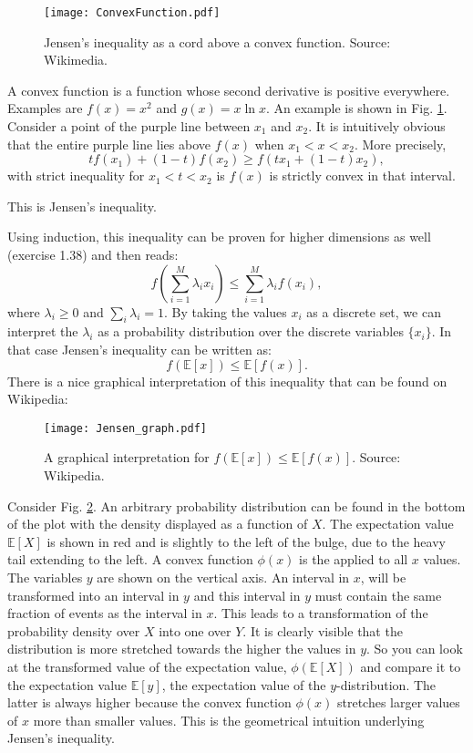 \begin{figure}[!ht]
\begin{center}
\texttt{[image: ConvexFunction.pdf]}
\end{center}
\caption{Jensen's inequality as a cord above a convex function. Source: Wikimedia.}
\label{fig-convex}
\end{figure}

A convex function is a function whose second derivative is positive everywhere. Examples are $f(x) = x^2$ and $g(x) = x \ln x$. An example is shown in Fig. \ref{fig-convex}.
Consider a point of the purple line between $x_1$ and $x_2$. It is intuitively obvious that the entire purple line lies above $f(x)$ when $x_1 < x < x_2$. More precisely,
$$
tf(x_1) + (1-t)f(x_2) \ge f(t x_1 + (1 - t) x_2),
$$
with strict inequality for $x_1 < t < x_2$ is $f(x)$ is strictly convex in that interval.

This is Jensen's inequality.

Using induction, this inequality can be proven for higher dimensions as well \cite{bishop2006} (exercise 1.38) and then reads:
\begin{equation}
  f(\sum^M_{i=1} \lambda_i x_i) \le \sum^M_{i=1} \lambda_i f(x_i),
 \end{equation}
where $\lambda_i \ge 0$ and $\sum_i \lambda_i =1$.
By taking the values $x_i$ as a discrete set, we can interpret the $\lambda_i$ as a probability distribution over the discrete variables $\{ x_i \}$. In that
case Jensen's inequality can be written as:
$$
f(\mathbb{E}[x]) \le \mathbb{E}[f(x)].
$$
There is a nice graphical interpretation of this inequality that can be found on Wikipedia:
\begin{figure}[!h]
  \begin{center}
    \texttt{[image: Jensen\_graph.pdf]}
  \end{center}
  \caption{A graphical interpretation for $f(\mathbb{E}[x]) \le \mathbb{E}[f(x)]$.
 Source: Wikipedia.}
  \label{fig-jensen}
\end{figure}
Consider Fig. \ref{fig-jensen}. An arbitrary probability distribution can be found in the bottom of the plot with the density displayed as a function
of $X$. The expectation value $\mathbb{E}[X]$ is shown in red and is slightly to the left of the bulge, due to the heavy tail extending to the left.
A convex function $\phi(x)$ is the applied to all $x$ values. The variables $y$  are shown on the vertical axis. An interval in $x$, will be transformed
into an interval in $y$ and this interval in $y$ must contain the same fraction of events as the interval in $x$. This leads to a transformation
of the probability density over $X$ into one over $Y$. It is clearly visible  that the distribution is more stretched towards the higher the values in $y$.
So you can look at the transformed value of the expectation value, $\phi(\mathbb{E}[X])$ and compare it to the expectation value $\mathbb{E}[y]$, the
expectation value of the $y$-distribution. The latter is always higher because the convex function $\phi(x)$ stretches larger values of $x$ more than smaller values. This is
the geometrical intuition underlying Jensen's inequality.

